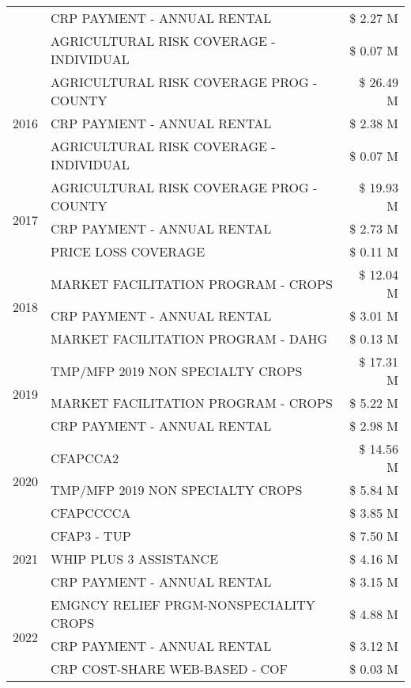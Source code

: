 \begin{tabular}{llr}
 & CRP PAYMENT - ANNUAL RENTAL & \$ 2.27 M \\
 & AGRICULTURAL RISK COVERAGE - INDIVIDUAL & \$ 0.07 M \\
\cline{1-3}
\multirow[t]{3}{*}{2016} & AGRICULTURAL RISK COVERAGE PROG - COUNTY & \$ 26.49 M \\
 & CRP PAYMENT - ANNUAL RENTAL & \$ 2.38 M \\
 & AGRICULTURAL RISK COVERAGE - INDIVIDUAL & \$ 0.07 M \\
\cline{1-3}
\multirow[t]{3}{*}{2017} & AGRICULTURAL RISK COVERAGE PROG - COUNTY & \$ 19.93 M \\
 & CRP PAYMENT - ANNUAL RENTAL & \$ 2.73 M \\
 & PRICE LOSS COVERAGE & \$ 0.11 M \\
\cline{1-3}
\multirow[t]{3}{*}{2018} & MARKET FACILITATION PROGRAM - CROPS & \$ 12.04 M \\
 & CRP PAYMENT - ANNUAL RENTAL & \$ 3.01 M \\
 & MARKET FACILITATION PROGRAM - DAHG & \$ 0.13 M \\
\cline{1-3}
\multirow[t]{3}{*}{2019} & TMP/MFP 2019 NON SPECIALTY CROPS & \$ 17.31 M \\
 & MARKET FACILITATION PROGRAM - CROPS & \$ 5.22 M \\
 & CRP PAYMENT - ANNUAL RENTAL & \$ 2.98 M \\
\cline{1-3}
\multirow[t]{3}{*}{2020} & CFAPCCA2 & \$ 14.56 M \\
 & TMP/MFP 2019 NON SPECIALTY CROPS & \$ 5.84 M \\
 & CFAPCCCCA & \$ 3.85 M \\
\cline{1-3}
\multirow[t]{3}{*}{2021} & CFAP3 - TUP & \$ 7.50 M \\
 & WHIP PLUS 3 ASSISTANCE & \$ 4.16 M \\
 & CRP PAYMENT - ANNUAL RENTAL & \$ 3.15 M \\
\cline{1-3}
\multirow[t]{3}{*}{2022} & EMGNCY RELIEF PRGM-NONSPECIALITY CROPS & \$ 4.88 M \\
 & CRP PAYMENT - ANNUAL RENTAL & \$ 3.12 M \\
 & CRP COST-SHARE WEB-BASED - COF & \$ 0.03 M \\
\cline{1-3}
\bottomrule
\end{tabular}
